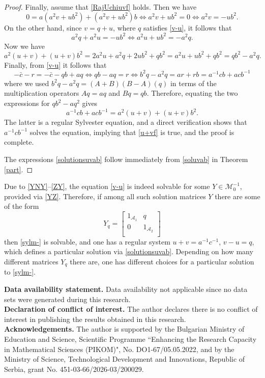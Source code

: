 \documentclass{article}
\theoremstyle{definition}
\def\A{{\mathcal{A}}}
\newcommand{\mat}[4]{\left[\begin{array}{cc}#1 & #2 \\ #3 & #4 \\
	\end{array}\right]}
\begin{document}
\begin{proof}
Finally, assume that \eqref{RajUchiuvf} holds. Then we have
$$0=a(a^2v+ub^2)+(a^2v+ub^2)b\Leftrightarrow a^2v+ub^2=0\Leftrightarrow a^2v=-ub^2.$$
On the other hand, since $v=q+u$, where $q$ satisfies \eqref{v-u}, it follows that
$$a^2q+a^2u=-ub^2\Leftrightarrow a^2u+ub^2=-a^2q.$$
Now we have
$$a^2(u+v)+(u+v)b^2=2a^2u+a^2q+2ub^2+qb^2=a^2u+ub^2+qb^2=qb^2-a^2q.$$
Finally, from \eqref{v-u} it follows that
$$-\bar{c}-r=-\bar{c}-qb+aq\Leftrightarrow qb-aq=r\Leftrightarrow b^2q-a^2q=ar+rb=a^{-1}cb+acb^{-1}$$
where we used $b^2q-a^2q=(A+B)(B-A)(q)$ in terms of the multiplication operators $Aq=aq$ and $Bq=qb$. Therefore, equating the two expressions for $qb^2-aq^2$ gives
$$a^{-1}cb+acb^{-1}=a^2(u+v)+(u+v)b^2.$$
The latter is a regular Sylvester equation, and a direct verification shows that $a^{-1}cb^{-1}$ solves the equation, implying that \eqref{u+vf} is true, and the proof is complete. 

The expressions \eqref{solutionsuvab} follow immediately from \eqref{soluvab} in Theorem \ref{part}.
\end{proof}
Due to \eqref{YNY}--\eqref{ZY}, the equation \eqref{v-u} is indeed solvable for some $Y\in\mathcal{M}_0^{-1}$, provided via \eqref{YZ}.  Therefore, if among all such solution matrices $Y$ there are some of the form
$$Y_q=\mat{1_{\A_1}}{q}{0}{1_{\A_2}}$$
then \eqref{sylm-} is solvable, and one has a regular system $u+v=a^{-1}c^{-1}$, $v-u=q$, which defines a particular solution via \eqref{solutionsuvab}. Depending on how many different matrices $Y_q$ there are, one has different choices for a particular solution to \eqref{sylm-}.



\noindent\textbf{Data availability statement.} Data availability not applicable since no data sets were generated during this research.\\

\noindent\textbf{Declaration of conflict of interest.} The author declares there is no conflict of interest in publishing the results obtained in this research.\\

\noindent\textbf{Acknowledgements.} The author is supported by the Bulgarian Ministry of Education
and Science, Scientific Programme ``Enhancing the Research Capacity in Mathematical Sciences (PIKOM)",
No. DO1-67/05.05.2022, and by the Ministry of Science, Technological Development and Innovations, Republic of Serbia, grant No. 451-03-66/2026-03/200029.
\end{document}

